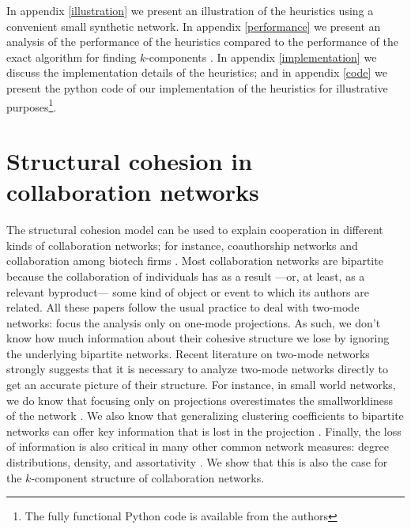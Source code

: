 In appendix \ref{illustration} we present an illustration of the heuristics using a convenient small synthetic network. In appendix \ref{performance} we present an analysis of the performance of the heuristics compared to the performance of the exact algorithm for finding $k$-components \citep{moody:2003}. In appendix \ref{implementation} we discuss the implementation details of the heuristics; and in appendix \ref{code} we present the python code of our implementation of the heuristics for illustrative purposes\footnote{The fully functional Python code is available from the authors}.

\section{Structural cohesion in collaboration networks}

The structural cohesion model can be used to explain cooperation in different kinds of collaboration networks; for instance, coauthorship networks \citep{moody:2004, white:2004} and collaboration among biotech firms \citep{powell:2005}. Most collaboration networks are bipartite because the collaboration of individuals has as a result ---or, at least, as a relevant byproduct--- some kind of object or event to which its authors are related. All these papers follow the usual practice to deal with two-mode networks: focus the analysis only on one-mode projections. As such, we don't know how much information about their cohesive structure we lose by ignoring the underlying bipartite networks. Recent literature on two-mode networks strongly suggests that it is necessary to analyze two-mode networks directly to get an accurate picture of their structure. For instance, in small world networks, we do know that focusing only on projections overestimates the smallworldiness of the network \citep{uzzi:2007}.  We also know that generalizing clustering coefficients to bipartite networks can offer key information that is lost in the projection  \citep{robins:2004,lind:2005,opsahl:2011}.  Finally,  the loss of information is also critical in many other common network measures: degree distributions, density, and assortativity \citep{latapy:2008}. We show that this is also the case for the $k$-component structure of collaboration networks.

